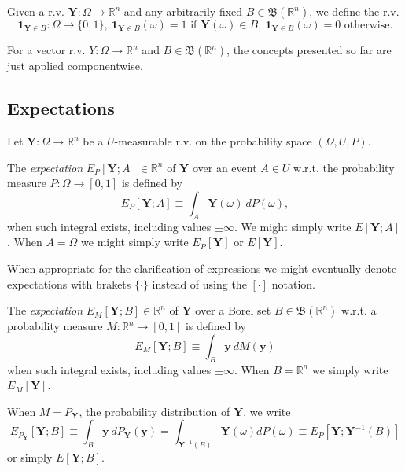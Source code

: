 Given a r.v. $\mathbf{Y}:\Omega\rightarrow\mathbb{R}^n$ and any arbitrarily fixed $B\in\mathfrak{B}(\mathbb{R}^n)$,
we define the r.v. 
\begin{equation*}
\mathbf{1}_{\mathbf{Y}\in B}:\Omega\rightarrow\{0,1\},
~\mathbf{1}_{\mathbf{Y}\in B}(\omega)=1\mbox{ if }\mathbf{Y}(\omega)\in B,
~\mathbf{1}_{\mathbf{Y}\in B}(\omega)=0\mbox{ otherwise}.
\end{equation*}

For a vector r.v. $Y:\Omega\rightarrow\mathbb{R}^n$ and $B\in\mathfrak{B}(\mathbb{R}^n)$,
the concepts presented so far are just applied componentwise.

\subsection{Expectations}

Let $\mathbf{Y}:\Omega\rightarrow \mathbb{R}^n$ be a $U$-measurable r.v. on the probability space $(\Omega,U,P)$.

The {\it expectation} $E_P[\mathbf{Y};A]\in\mathbb{R}^n$
of $\mathbf{Y}$
over an event $A\in U$
w.r.t. the probability measure $P:\Omega\rightarrow [0,1]$
is defined by
\begin{equation*}
E_P[\mathbf{Y};A] \equiv
\int_{A} \mathbf{Y}(\omega)~dP(\omega),
\end{equation*}
when such integral exists, including values $\pm\infty$.
We might simply write $E[\mathbf{Y};A]$.
When $A=\Omega$ we might simply write $E_P[\mathbf{Y}]$ or $E[\mathbf{Y}]$.

When appropriate for the clarification of expressions
we might eventually denote expectations with brakets $\{\cdot\}$ instead of using the $[\cdot]$ notation.

The {\it expectation} $E_M[\mathbf{Y};B]\in\mathbb{R}^n$
of $\mathbf{Y}$
over a Borel set $B\in\mathfrak{B}(\mathbb{R}^n)$
w.r.t. a probability measure $M:\mathbb{R}^n\rightarrow [0,1]$
is defined by
\begin{equation*}
E_M[\mathbf{Y};B] \equiv
\int_{B} \mathbf{y}~dM(\mathbf{y})
\end{equation*}
when such integral exists, including values $\pm\infty$.
When $B=\mathbb{R}^n$ we simply write
$E_M[\mathbf{Y}]$.

When $M=P_{\mathbf{Y}}$, the probability distribution of $\mathbf{Y}$, we write
\begin{equation*}
E_{P_{\mathbf{Y}}}[\mathbf{Y};B] \equiv
\int_{B} \mathbf{y}~dP_\mathbf{Y}(\mathbf{y}) =
\int_{\mathbf{Y}^{-1}(B)}\mathbf{Y}(\omega)dP(\omega) \equiv
E_P[\mathbf{Y};\mathbf{Y}^{-1}(B)]
\end{equation*}
or simply
$E[\mathbf{Y};B]$.

